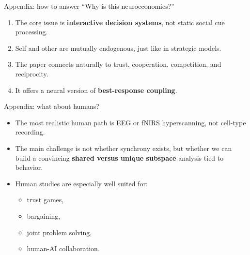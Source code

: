 \documentclass[aspectratio=169,11pt]{beamer}
\begin{document}
\begin{frame}{Appendix: how to answer ``Why is this neuroeconomics?''}
\begin{enumerate}
  \item The core issue is \textbf{interactive decision systems}, not static social cue processing.
  \item Self and other are mutually endogenous, just like in strategic models.
  \item The paper connects naturally to trust, cooperation, competition, and reciprocity.
  \item It offers a neural version of \textbf{best-response coupling}.
\end{enumerate}
\end{frame}

\begin{frame}{Appendix: what about humans?}
\begin{itemize}
  \item The most realistic human path is EEG or fNIRS hyperscanning, not cell-type recording.
  \item The main challenge is not whether synchrony exists, but whether we can build a convincing \textbf{shared versus unique subspace} analysis tied to behavior.
  \item Human studies are especially well suited for:
  \begin{itemize}
    \item trust games,
    \item bargaining,
    \item joint problem solving,
    \item human-AI collaboration.
  \end{itemize}
\end{itemize}
\end{frame}
\end{document}

